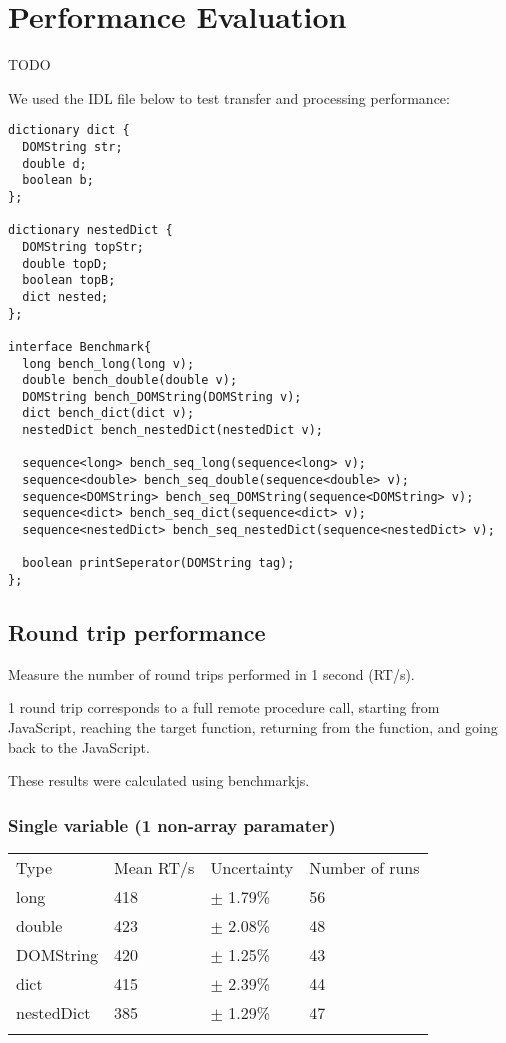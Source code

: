 \section{Performance Evaluation} %
\label{sec:performance_evaluation}
TODO 


We used the IDL file below to test transfer and processing performance:

\begin{verbatim}
dictionary dict {
  DOMString str;
  double d;
  boolean b;
};

dictionary nestedDict {
  DOMString topStr;
  double topD;
  boolean topB;
  dict nested;
};

interface Benchmark{
  long bench_long(long v);
  double bench_double(double v);
  DOMString bench_DOMString(DOMString v);
  dict bench_dict(dict v);
  nestedDict bench_nestedDict(nestedDict v);

  sequence<long> bench_seq_long(sequence<long> v);
  sequence<double> bench_seq_double(sequence<double> v);
  sequence<DOMString> bench_seq_DOMString(sequence<DOMString> v);
  sequence<dict> bench_seq_dict(sequence<dict> v);
  sequence<nestedDict> bench_seq_nestedDict(sequence<nestedDict> v);

  boolean printSeperator(DOMString tag);
};
\end{verbatim}

\subsection{Round trip performance}\label{round-trip-performance}

Measure the number of round trips performed in 1 second (RT/s).

1 round trip corresponds to a full remote procedure call, starting from
JavaScript, reaching the target function, returning from the function,
and going back to the JavaScript.

These results were calculated using benchmarkjs.

\subsubsection{Single variable (1 non-array
paramater)}\label{single-variable-1-non-array-paramater}

\begin{longtable}[c]{@{}llll@{}}
\toprule\addlinespace
Type & Mean RT/s & Uncertainty & Number of runs
\\\addlinespace
\midrule\endhead
long & 418 & $\pm$  1.79\% & 56
\\\addlinespace
double & 423 & $\pm$  2.08\% & 48
\\\addlinespace
DOMString & 420 & $\pm$  1.25\% & 43
\\\addlinespace
dict & 415 & $\pm$  2.39\% & 44
\\\addlinespace
nestedDict & 385 & $\pm$  1.29\% & 47
\\\addlinespace
\bottomrule
\end{longtable}

